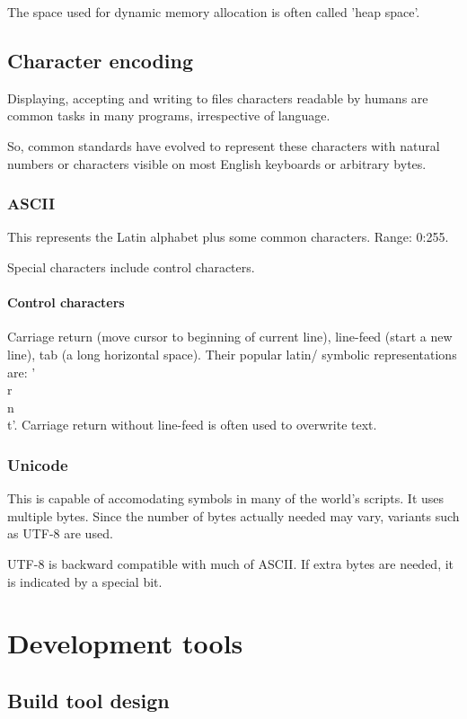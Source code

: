 The space used for dynamic memory allocation is often called 'heap space'.

\chapter{Character encoding}
Displaying, accepting and writing to files characters readable by humans are common tasks in many programs, irrespective of language.

So, common standards have evolved to represent these characters with natural numbers or characters visible on most English keyboards or arbitrary bytes.

\section{ASCII}
This represents the Latin alphabet plus some common characters. Range: 0:255.

Special characters include control characters.

\subsection{Control characters}
Carriage return (move cursor to beginning of current line), line-feed (start a new line), tab (a long horizontal space). Their popular latin/ symbolic representations are: '\\r\\n\\t'. Carriage return without line-feed is often used to overwrite text.

\section{Unicode}
This is capable of accomodating symbols in many of the world's scripts. It uses multiple bytes. Since the number of bytes actually needed may vary, variants such as UTF-8 are used.

UTF-8 is backward compatible with much of ASCII. If extra bytes are needed, it is indicated by a special bit.



\part{Development tools}
\chapter{Build tool design}
